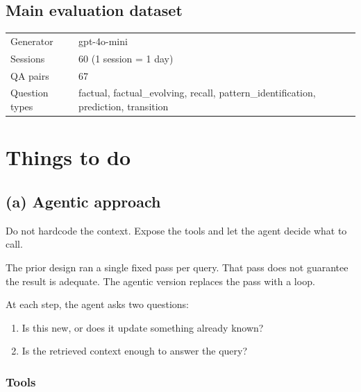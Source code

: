 \documentclass[11pt]{article}
\begin{document}
\subsection{Main evaluation dataset}

\begin{table}[h]
\centering
\begin{tabularx}{\textwidth}{@{}l L@{}}
\toprule
Generator      & gpt-4o-mini \\
Sessions       & 60 (1 session = 1 day) \\
QA pairs       & 67 \\
Question types & factual, factual\_evolving, recall, pattern\_identification,
                 prediction, transition \\
\bottomrule
\end{tabularx}
\end{table}

\section{Things to do}

\subsection{(a) Agentic approach}

Do not hardcode the context. Expose the tools and let the agent decide what to call.

The prior design ran a single fixed pass per query. That pass does not guarantee the
result is adequate. The agentic version replaces the pass with a loop.

At each step, the agent asks two questions:

\begin{enumerate}[itemsep=2pt, topsep=4pt]
  \item Is this new, or does it update something already known?
  \item Is the retrieved context enough to answer the query?
\end{enumerate}

\subsubsection*{Tools}
\end{document}
